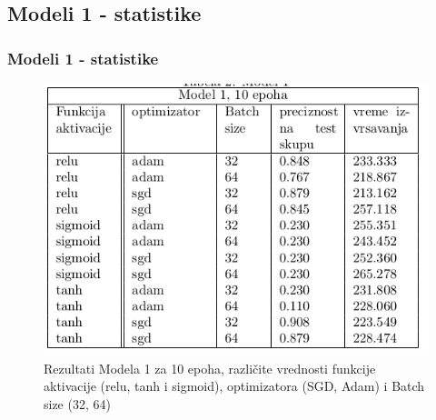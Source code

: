 \documentclass{beamer}
\begin{document}
\subsection{Modeli 1 - statistike}
\begin{frame}
\frametitle{Modeli 1 - statistike}

\begin{figure}
\includegraphics[scale=0.40]{stat_model1_10.png}
\caption{Rezultati Modela 1 za 10 epoha, različite vrednosti funkcije aktivacije (relu, tanh i sigmoid), optimizatora (SGD, Adam) i Batch size (32, 64)}
\end{figure}


\end{frame}

\end{document}
